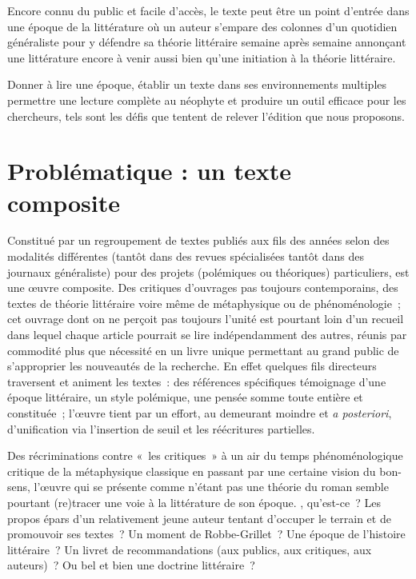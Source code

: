 \documentclass[12pt, a4paper]{article}
\begin{document}
Encore connu du public et facile d'accès, le texte peut être un point d'entrée dans une époque de la littérature où un auteur s'empare des colonnes d'un quotidien généraliste pour y défendre sa théorie littéraire semaine après semaine annonçant une littérature encore à venir aussi bien qu'une initiation à la théorie littéraire.

Donner à lire une époque, établir un texte dans ses environnements multiples permettre une lecture complète au néophyte et produire un outil efficace pour les chercheurs, tels sont les défis que tentent de relever l'édition que nous proposons.




%




\section{Problématique : un texte composite}

Constitué par un regroupement de textes publiés aux fils des années selon des modalités différentes (tantôt dans des revues spécialisées tantôt dans des journaux généraliste) pour des projets (polémiques ou théoriques) particuliers, \punr{} est une œuvre composite. Des critiques d'ouvrages pas toujours contemporains, des textes de théorie littéraire voire même de métaphysique ou de phénoménologie~; cet ouvrage dont on ne perçoit pas toujours l'unité est pourtant loin d'un recueil dans lequel chaque article pourrait se lire indépendamment des autres, réunis par commodité plus que nécessité en un livre unique permettant au grand public de s'approprier les nouveautés de la recherche. En effet quelques fils directeurs traversent et animent les textes~: des références spécifiques témoignage d'une époque littéraire, un style polémique, une pensée somme toute entière et constituée~; l'œuvre tient par un effort, au demeurant moindre et \textit{a posteriori}, d'unification via l'insertion de seuil et les réécritures partielles.

Des récriminations contre «~les critiques~» à un air du temps phénoménologique critique de la métaphysique classique en passant par une certaine vision du bon-sens, l'œuvre qui se présente comme n'étant pas une théorie du roman semble pourtant (re)tracer une voie à la littérature de son époque. \punr, qu'est-ce~? Les propos épars d'un relativement jeune auteur tentant d'occuper le terrain et de promouvoir ses textes~? Un moment de Robbe-Grillet~? Une époque de l'histoire littéraire~? Un livret de recommandations (aux publics, aux critiques, aux auteurs)~? Ou bel et bien une doctrine littéraire~?
\end{document}
